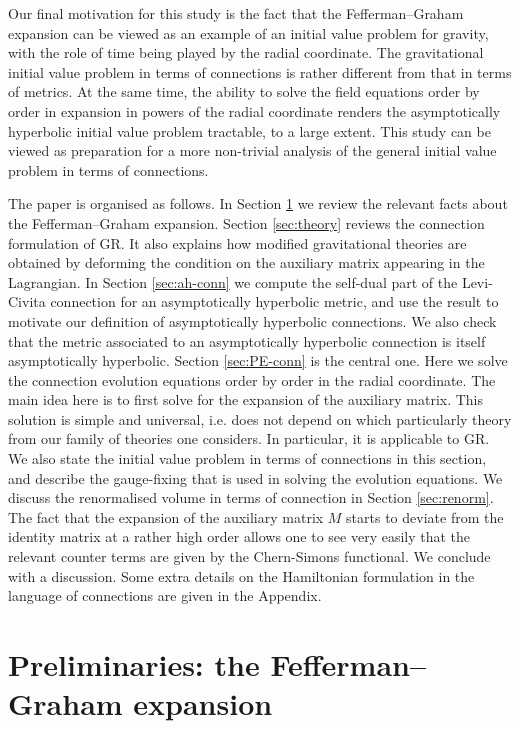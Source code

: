 \documentclass[a4paper,12pt]{article}
\begin{document}
Our final motivation for this study is the fact that the Fefferman--Graham expansion can be viewed as an example of an initial value problem for gravity, with the role of time being played by the radial coordinate. The gravitational initial value problem in terms of connections is rather different from that in terms of metrics. At the same time, the ability to solve the field equations order by order in expansion in powers of the radial coordinate renders the asymptotically hyperbolic initial value problem tractable, to a large extent. This study can be viewed as preparation for a more non-trivial analysis of the general initial value problem in terms of connections. 

The paper is organised as follows. In Section \ref{sec:FH} we review the relevant facts about the Fefferman--Graham expansion. Section \ref{sec:theory} reviews the connection formulation of GR. It also explains how modified gravitational theories are obtained by deforming the condition on the auxiliary matrix appearing in the Lagrangian. In Section \ref{sec:ah-conn} we compute the self-dual part of the Levi-Civita connection for an asymptotically hyperbolic metric, and use the result to motivate our definition of asymptotically hyperbolic connections. We also check that the metric associated to an asymptotically hyperbolic connection is itself asymptotically hyperbolic. Section \ref{sec:PE-conn} is the central one. Here we solve the connection evolution equations order by order in the radial coordinate. The main idea here is to first solve for the expansion of the auxiliary matrix. This solution is simple and universal, i.e. does not depend on which particularly theory from our family of theories one considers. In particular, it is applicable to GR. We also state the initial value problem in terms of connections in this section, and describe the gauge-fixing that is used in solving the evolution equations. We discuss the renormalised volume in terms of connection in Section \ref{sec:renorm}. The fact that the expansion of the auxiliary matrix $M$ starts to deviate from the identity matrix at a rather high order allows one to see very easily that the relevant counter terms are given by the Chern-Simons functional. We conclude with a discussion. Some extra details on the Hamiltonian formulation in the language of connections are given in the Appendix. 


\section{Preliminaries: the Fefferman--Graham expansion}
\label{sec:FH}
\end{document}
